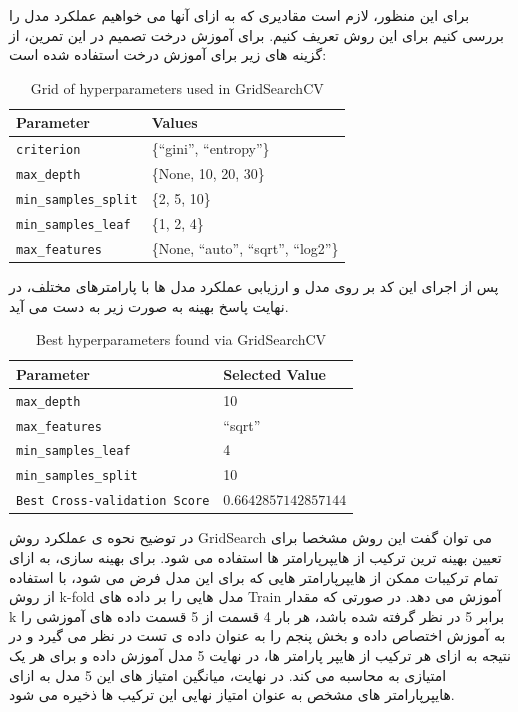 \documentclass{article}
\begin{document}
برای این منظور، لازم است مقادیری که به ازای آنها می خواهیم عملکرد مدل را بررسی کنیم برای این روش تعریف کنیم. برای آموزش درخت تصمیم در این تمرین، از گزینه های زیر برای آموزش درخت استفاده شده است:
\begin{table}[h!]
\centering
\begin{tabular}{|l|l|}
\hline
\textbf{Parameter} & \textbf{Values} \\
\hline
\texttt{criterion} & \{``gini'', ``entropy''\} \\
\texttt{max\_depth} & \{None, 10, 20, 30\} \\
\texttt{min\_samples\_split} & \{2, 5, 10\} \\
\texttt{min\_samples\_leaf} & \{1, 2, 4\} \\
\texttt{max\_features} & \{None, ``auto'', ``sqrt'', ``log2''\} \\
\hline
\end{tabular}
\caption{Grid of hyperparameters used in GridSearchCV}
\label{tab:param_grid}
\end{table}

پس از اجرای این کد بر روی مدل و ارزیابی عملکرد مدل ها با پارامترهای مختلف، در نهایت پاسخ بهینه به صورت زیر به دست می آید.
\begin{table}[h!]
\centering
\begin{tabular}{|l|l|}
\hline
\textbf{Parameter} & \textbf{Selected Value} \\
\hline
\texttt{max\_depth} & 10 \\
\texttt{max\_features} & ``sqrt'' \\
\texttt{min\_samples\_leaf} & 4 \\
\texttt{min\_samples\_split} & 10 \\
\texttt{Best Cross-validation Score} & $0.6642857142857144$ \\
\hline
\end{tabular}
\caption{Best hyperparameters found via GridSearchCV}
\label{tab:best_params}
\end{table}

در توضیح نحوه ی عملکرد روش GridSearch 
می توان گفت این روش مشخصا برای تعیین بهینه ترین ترکیب از هایپرپارامتر ها استفاده می شود. برای بهینه سازی، به ازای تمام ترکیبات ممکن از هایپرپارامتر هایی که برای این مدل فرض می شود، با استفاده از روش k-fold مدل هایی را بر داده های Train آموزش می دهد. در صورتی که مقدار k برابر 5 در نظر گرفته شده باشد، هر بار 4 قسمت از 5 قسمت داده های آموزشی را به آموزش اختصاص داده و بخش پنجم را به عنوان داده ی تست در نظر می گیرد و در نتیجه به ازای هر ترکیب از هایپر پارامتر ها، در نهایت 5 مدل آموزش داده و برای هر یک امتیازی به محاسبه می کند. در نهایت، میانگین امتیاز های این 5 مدل به ازای هایپرپارامتر های مشخص به عنوان امتیاز نهایی این ترکیب ها ذخیره می شود. 
\end{document}
